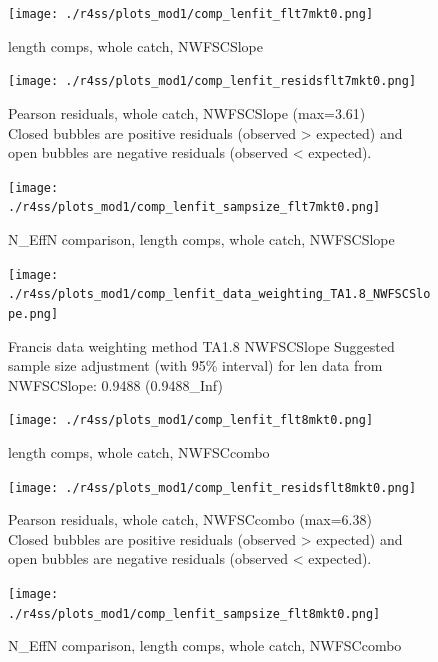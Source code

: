 \documentclass[12pt,]{article}
\begin{document}
\begin{figure}
\centering
\texttt{[image: ./r4ss/plots\_mod1/comp\_lenfit\_flt7mkt0.png]}
\caption{length comps, whole catch, NWFSCSlope
\label{fig:mod1_26_comp_lenfit_flt7mkt0}}
\end{figure}

\begin{figure}
\centering
\texttt{[image: ./r4ss/plots\_mod1/comp\_lenfit\_residsflt7mkt0.png]}
\caption{Pearson residuals, whole catch, NWFSCSlope (max=3.61)\\
Closed bubbles are positive residuals (observed \textgreater{} expected)
and open bubbles are negative residuals (observed \textless{} expected).
\label{fig:mod1_27_comp_lenfit_residsflt7mkt0}}
\end{figure}

\begin{figure}
\centering
\texttt{[image: ./r4ss/plots\_mod1/comp\_lenfit\_sampsize\_flt7mkt0.png]}
\caption{N\_EffN comparison, length comps, whole catch, NWFSCSlope
\label{fig:mod1_28_comp_lenfit_sampsize_flt7mkt0}}
\end{figure}

\begin{figure}
\centering
\texttt{[image: ./r4ss/plots\_mod1/comp\_lenfit\_data\_weighting\_TA1.8\_NWFSCSlope.png]}
\caption{Francis data weighting method TA1.8 NWFSCSlope Suggested sample
size adjustment (with 95\% interval) for len data from NWFSCSlope:
0.9488 (0.9488\_Inf)
\label{fig:mod1_29_comp_lenfit_data_weighting_TA1.8_NWFSCSlope}}
\end{figure}

\begin{figure}
\centering
\texttt{[image: ./r4ss/plots\_mod1/comp\_lenfit\_flt8mkt0.png]}
\caption{length comps, whole catch, NWFSCcombo
\label{fig:mod1_30_comp_lenfit_flt8mkt0}}
\end{figure}

\begin{figure}
\centering
\texttt{[image: ./r4ss/plots\_mod1/comp\_lenfit\_residsflt8mkt0.png]}
\caption{Pearson residuals, whole catch, NWFSCcombo (max=6.38)\\
Closed bubbles are positive residuals (observed \textgreater{} expected)
and open bubbles are negative residuals (observed \textless{} expected).
\label{fig:mod1_31_comp_lenfit_residsflt8mkt0}}
\end{figure}

\begin{figure}
\centering
\texttt{[image: ./r4ss/plots\_mod1/comp\_lenfit\_sampsize\_flt8mkt0.png]}
\caption{N\_EffN comparison, length comps, whole catch, NWFSCcombo
\label{fig:mod1_32_comp_lenfit_sampsize_flt8mkt0}}
\end{figure}
\end{document}
